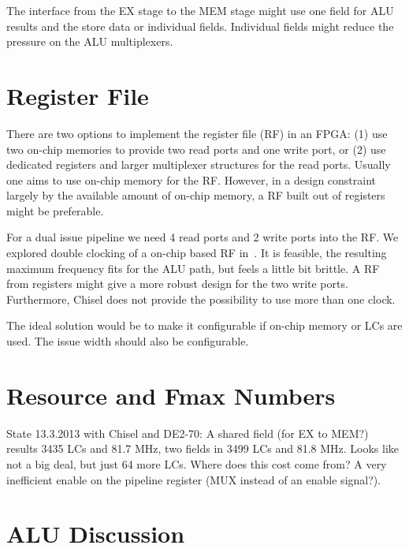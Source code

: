 \documentclass[a4paper,fontsize=10pt,twoside,DIV15,BCOR12mm,headinclude=true,footinclude=false,pagesize,bibtotoc]{scrbook}
\newcommand{\comment}[3]{

\textsf{\textbf{#1}} {\color{#3}#2}}
\newcommand{\martin}[1]{\comment{Martin}{#1}{Blue}}
\renewcommand{\martin}[1]{}
\begin{document}
The interface from the EX stage to the MEM stage might use one
field for ALU results and the store data or individual fields. Individual
fields might reduce the pressure on the ALU multiplexers.
\martin{Update to the current implementation -- check for difference.}


\section{Register File}

There are two options to implement the register file (RF) in an FPGA: (1) use
two on-chip memories to provide two read ports and one write port, or (2)
use dedicated registers and larger multiplexer structures for the read
ports. Usually one aims to use on-chip memory for the RF. However,
in a design constraint largely by the available amount of on-chip memory,
a RF built out of registers might be preferable.

For a dual issue pipeline we need 4 read ports and 2 write ports into the RF.
We explored double clocking of a on-chip based RF in~\cite{patmos:ppes2011}.
It is feasible, the resulting maximum frequency fits for the ALU path, but feels
a little bit brittle. A RF from registers might give a more robust design for the
two write ports. Furthermore, Chisel does not provide the possibility to use
more than one clock.

The ideal solution would be to make it configurable if on-chip memory or
LCs are used. The issue width should also be configurable.




\section{Resource and Fmax Numbers}

State 13.3.2013 with Chisel and DE2-70: A shared field (for EX to MEM?) results 3435 LCs
and 81.7 MHz, two fields in 3499 LCs and 81.8 MHz. Looks like not a big deal,
but just 64 more LCs. Where does this cost come from? A very inefficient
enable on the pipeline register (MUX instead of an enable signal?).

\martin{Update with reduced ALU muxes and also with additional second
ALU pipeline (forwarding). Is dual issue configurable?}

\section{ALU Discussion}
\end{document}
